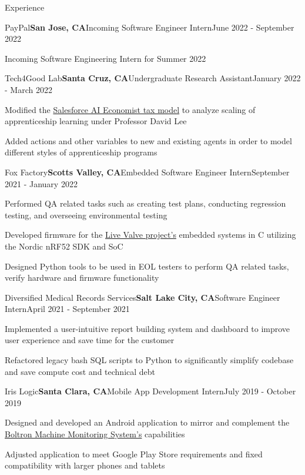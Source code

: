 \documentclass{resume}
\begin{document}
\begin{rSection}{\large Experience}

\begin{rSubsection}{PayPal}{\bf{San Jose, CA}}{Incoming Software Engineer Intern}{June 2022 - September 2022}
\item Incoming Software Engineering Intern for Summer 2022
\end{rSubsection}

\begin{rSubsection}{Tech4Good Lab}{\bf{Santa Cruz, CA}}{Undergraduate Research Assistant}{January 2022 - March 2022}
\item Modified the \href{https://github.com/salesforce/ai-economist}{Salesforce AI Economist tax model} to analyze scaling of apprenticeship learning under Professor David Lee
\item Added actions and other variables to new and existing agents in order to model different styles of apprenticeship programs
\end{rSubsection}

\begin{rSubsection}{Fox Factory}{\bf{Scotts Valley, CA}}{Embedded Software Engineer Intern}{September 2021 - January 2022}
\item Performed QA related tasks such as creating test plans, conducting regression testing, and overseeing environmental testing
\item Developed firmware for the \href{https://www.pinkbike.com/news/fox-updates-live-valve-electonic-suspension-for-2022.html}{Live Valve project's} embedded systems in C utilizing the Nordic nRF52 SDK and SoC
\item Designed Python tools to be used in EOL testers to perform QA related tasks, verify hardware and firmware functionality
\end{rSubsection}

\begin{rSubsection}{Diversified Medical Records Services}{\bf{Salt Lake City, CA}}{Software Engineer Intern}{April 2021 - September 2021}
\item Implemented a user-intuitive report building system and dashboard to improve user experience and save time for the customer
\item Refactored legacy bash SQL scripts to Python to significantly simplify codebase and save compute cost and technical debt
\end{rSubsection}

\begin{rSubsection}{Iris Logic}{\bf{Santa Clara, CA}}{Mobile App Development Intern}{July 2019 - October 2019}
\item Designed and developed an Android application to mirror and complement the \href{https://irislogic.com/boltron-machine-monitoring-system/}{Boltron Machine Monitoring System's} capabilities
\item Adjusted application to meet Google Play Store requirements and fixed compatibility with larger phones and tablets
\end{rSubsection}
\end{rSection}
\end{document}
